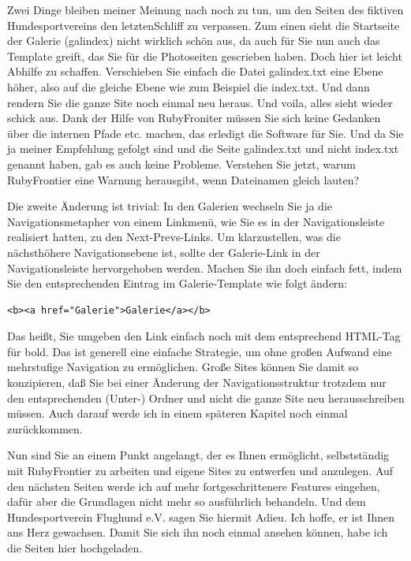 \documentclass[11pt]{report}
\begin{document}
Zwei Dinge bleiben meiner Meinung nach noch zu tun, um den Seiten des
fiktiven Hundesportvereins den letztenSchliff zu verpassen. Zum einen
sieht die Startseite der Galerie (galindex) nicht wirklich schön aus,
da auch für Sie nun auch das Template greift, das Sie für die
Photoseiten gescrieben haben. Doch hier ist leicht Abhilfe zu
schaffen. Verschieben Sie einfach die Datei galindex.txt eine Ebene
höher, also auf die gleiche Ebene wie zum Beispiel die index.txt. Und
dann rendern Sie die ganze Site noch einmal neu heraus. Und voila,
alles sieht wieder schick aus. Dank der Hilfe von RubyFroniter müssen
Sie sich keine Gedanken über die internen Pfade etc. machen, das
erledigt die Software für Sie. Und da Sie ja meiner Empfehlung gefolgt
sind und die Seite galindex.txt und nicht index.txt genannt haben, gab
es auch keine Probleme. Verstehen Sie jetzt, warum RubyFrontier eine
Warnung herausgibt, wenn Dateinamen gleich lauten?


Die zweite Änderung ist trivial: In den Galerien wechseln Sie ja die
Navigationsmetapher von einem Linkmenü, wie Sie es in der
Navigationsleiste realisiert hatten, zu den Next-Prevs-Links. Um
klarzustellen, was die nächsthöhere Navigationsebene ist, sollte der
Galerie-Link in der Navigationsleiste hervorgehoben werden. Machen Sie
ihn doch einfach fett, indem Sie den entsprechenden Eintrag im
Galerie-Template wie folgt ändern:


\begin{verbatim}
<b><a href="Galerie">Galerie</a></b>
\end{verbatim}

Das heißt, Sie umgeben den Link einfach noch mit dem entsprechend
HTML-Tag für bold. Das ist generell eine einfache Strategie, um ohne
großen Aufwand eine mehrstufige Navigation zu ermöglichen. Große Sites
können Sie damit so konzipieren, daß Sie bei einer Änderung der
Navigationsstruktur trotzdem nur den entsprechenden (Unter-) Ordner
und nicht die ganze Site neu herausschreiben müssen. Auch darauf werde
ich in einem späteren Kapitel noch einmal zurückkommen.

Nun sind Sie an einem Punkt angelangt, der es Ihnen ermöglicht,
selbstständig mit RubyFrontier zu arbeiten und eigene Sites zu
entwerfen und anzulegen. Auf den nächsten Seiten werde ich auf mehr
fortgeschrittenere Features eingehen, dafür aber die Grundlagen nicht
mehr so ausführlich behandeln. Und dem Hundesportverein Flughund
e.V. sagen Sie hiermit Adieu. Ich hoffe, er ist Ihnen ans Herz
gewachsen. Damit Sie sich ihn noch einmal ansehen können, habe ich die
Seiten hier hochgeladen.
\end{document}
